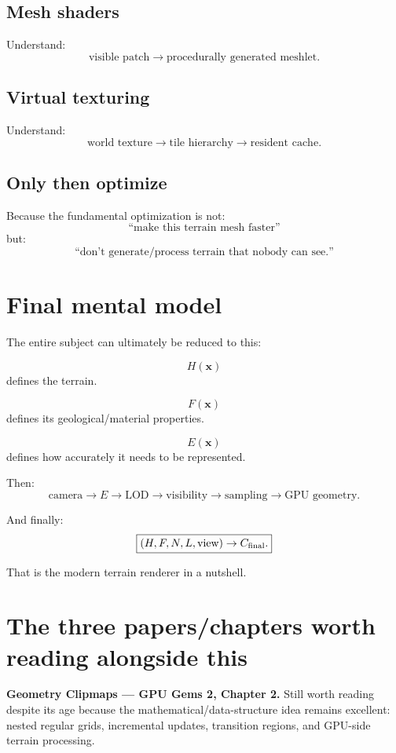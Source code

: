 \documentclass[12pt]{article}
\begin{document}
	\subsection{Mesh shaders}
	
	Understand:
	\[
	\text{visible patch} \rightarrow \text{procedurally generated meshlet}.
	\]
	
	\subsection{Virtual texturing}
	
	Understand:
	\[
	\text{world texture} \rightarrow \text{tile hierarchy} \rightarrow \text{resident cache}.
	\]
	
	\subsection{Only then optimize}
	
	Because the fundamental optimization is not:
	\[
	\text{``make this terrain mesh faster''}
	\]
	but:
	\[
	\boxed{
		\text{``don't generate/process terrain that nobody can see.''}
	}
	\]
	
	\section*{Final mental model}
	
	The entire subject can ultimately be reduced to this:
	
	\[
	\boxed{H(\mathbf x)}
	\]
	defines the terrain.
	
	\[
	\boxed{F(\mathbf x)}
	\]
	defines its geological/material properties.
	
	\[
	\boxed{E(\mathbf x)}
	\]
	defines how accurately it needs to be represented.
	
	Then:
	\[
	\boxed{
		\text{camera} \rightarrow E \rightarrow \text{LOD} \rightarrow \text{visibility} \rightarrow \text{sampling} \rightarrow \text{GPU geometry}.
	}
	\]
	
	And finally:
	\[
	\boxed{
		(H,F,N,L,\text{view}) \rightarrow C_{\rm final}.
	}
	\]
	
	That is the modern terrain renderer in a nutshell.
	
	\section*{The three papers/chapters worth reading alongside this}
	
	\textbf{Geometry Clipmaps — GPU Gems 2, Chapter 2.}
	Still worth reading despite its age because the mathematical/data-structure idea remains excellent: nested regular grids, incremental updates, transition regions, and GPU-side terrain processing.
	
\end{document}
